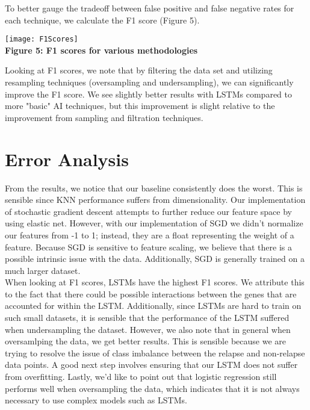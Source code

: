 \documentclass[12pt]{scrartcl}
\begin{document}
    
    
    To better gauge the tradeoff between false positive and false negative rates for each technique, we calculate the F1 score (Figure 5).
    
    \begin{center}
    \texttt{[image: F1Scores]}\\
    \textbf{Figure 5: F1 scores for various methodologies}
    \end{center}
    
    Looking at F1 scores, we note that by filtering the data set and utilizing resampling techniques (oversampling and undersampling), we can significantly improve the F1 score. We see slightly better results with LSTMs compared to more "basic" AI techniques, but this improvement is slight relative to the improvement from sampling and filtration techniques.


    \section{Error Analysis}
    From the results, we notice that our baseline consistently does the worst. This is sensible since KNN performance suffers from dimensionality. Our implementation of stochastic gradient descent attempts to further reduce our feature space by using elastic net. However, with our implementation of SGD we didn't normalize our features from -1 to 1; instead, they are a float representing the weight of a feature. Because SGD is sensitive to feature scaling, we believe that there is a possible intrinsic issue with the data. Additionally, SGD is generally trained on a much larger dataset. \\
    
    When looking at F1 scores, LSTMs have the highest F1 scores. We attribute this to the fact that there could be possible interactions between the genes that are accounted for within the LSTM. Additionally, since LSTMs are hard to train on such small datasets, it is sensible that the performance of the LSTM suffered when undersampling the dataset. However, we also note that in general when oversamlping the data, we get better results. This is sensible because we are trying to resolve the issue of class imbalance between the relapse and non-relapse data points. A good next step involves ensuring that our LSTM does not suffer from overfitting. Lastly, we'd like to point out that logistic regression still performs well when oversampling the data, which indicates that it is not always necessary to use complex models such as LSTMs. 
       
\end{document}
